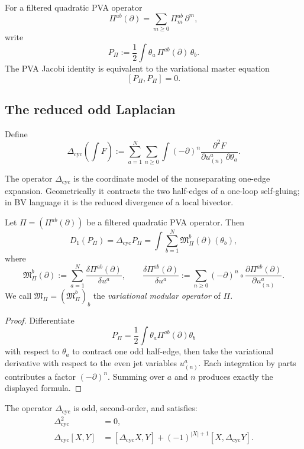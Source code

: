 For a filtered quadratic PVA operator
\[
\Pi^{ab}(\partial)=\sum_{m\ge 0}\Pi_m^{ab}\,\partial^m,
\]
write
\[
P_\Pi:=\frac12\int \theta_a\,\Pi^{ab}(\partial)\,\theta_b.
\]
The PVA Jacobi identity is equivalent to the variational master equation
\[
[P_\Pi,P_\Pi]=0.
\]

\subsection{The reduced odd Laplacian}

\begin{definition}
Define
\[
\Delta_{\mathrm{cyc}}\!\left(\int F\right)
:=
\sum_{a=1}^N\sum_{n\ge 0}
\int
(-\partial)^n
\frac{\partial^2 F}{\partial u^a_{(n)}\,\partial \theta_a}.
\]
\end{definition}

\begin{remark}[Interpretation]
The operator $\Delta_{\mathrm{cyc}}$ is the coordinate model of the nonseparating one-edge
expansion. Geometrically it contracts the two half-edges of a one-loop self-gluing; in BV
language it is the reduced divergence of a local bivector.
\end{remark}

\begin{theorem}\label{thm:D1formula}
Let $\Pi=(\Pi^{ab}(\partial))$ be a filtered quadratic PVA operator. Then
\[
D_1(P_\Pi)=\Delta_{\mathrm{cyc}}P_\Pi
=
\int \sum_{b=1}^N \mathfrak M_\Pi^b(\partial)(\theta_b),
\]
where
\[
\mathfrak M_\Pi^b(\partial)
:=
\sum_{a=1}^N \frac{\delta \Pi^{ab}(\partial)}{\delta u^a},
\qquad
\frac{\delta \Pi^{ab}(\partial)}{\delta u^a}
:=
\sum_{n\ge 0}(-\partial)^n\circ
\frac{\partial \Pi^{ab}(\partial)}{\partial u^a_{(n)}}.
\]
We call $\mathfrak M_\Pi=(\mathfrak M_\Pi^b)_b$ the \emph{variational modular operator}
of $\Pi$.
\end{theorem}

\begin{proof}
Differentiate
\[
P_\Pi=\frac12\int \theta_a\Pi^{ab}(\partial)\theta_b
\]
with respect to $\theta_a$ to contract one odd half-edge, then take the variational
derivative with respect to the even jet variables $u^a_{(n)}$. Each integration by parts
contributes a factor $(-\partial)^n$. Summing over $a$ and $n$ produces exactly the
displayed formula.
\end{proof}

\begin{lemma}\label{lem:BV}
The operator $\Delta_{\mathrm{cyc}}$ is odd, second-order, and satisfies:
\begin{align*}
\Delta_{\mathrm{cyc}}^2&=0,\\
\Delta_{\mathrm{cyc}}[X,Y]
&=
[\Delta_{\mathrm{cyc}}X,Y]
+(-1)^{|X|+1}[X,\Delta_{\mathrm{cyc}}Y].
\end{align*}
\end{lemma}

